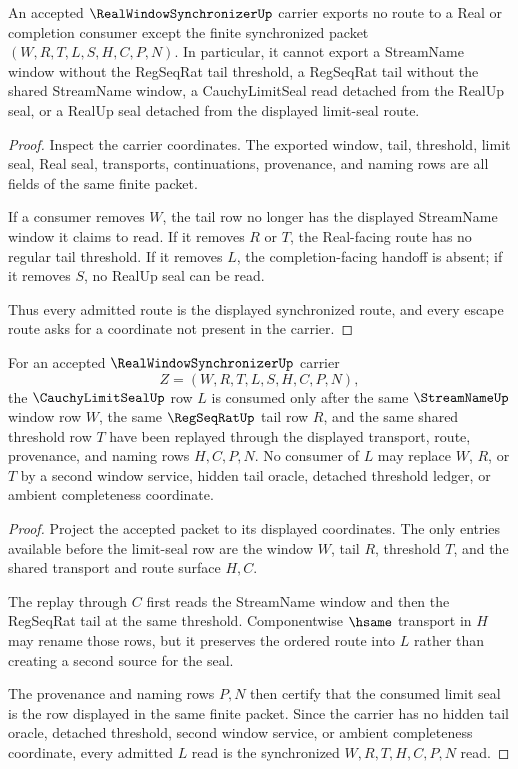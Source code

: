 \begin{theorem}
\label{thm:real-window-synchronizer-nonescape}
An accepted $\RealWindowSynchronizerUp$ carrier exports no route to a Real or completion consumer except the finite synchronized packet $(W,R,T,L,S,H,C,P,N)$. In particular, it cannot export a StreamName window without the RegSeqRat tail threshold, a RegSeqRat tail without the shared StreamName window, a CauchyLimitSeal read detached from the RealUp seal, or a RealUp seal detached from the displayed limit-seal route.
\end{theorem}
\begin{proof}
Inspect the carrier coordinates. The exported window, tail, threshold, limit seal, Real seal, transports, continuations, provenance, and naming rows are all fields of the same finite packet.

If a consumer removes $W$, the tail row no longer has the displayed StreamName window it claims to read. If it removes $R$ or $T$, the Real-facing route has no regular tail threshold. If it removes $L$, the completion-facing handoff is absent; if it removes $S$, no RealUp seal can be read.

Thus every admitted route is the displayed synchronized route, and every escape route asks for a coordinate not present in the carrier.
\end{proof}

\begin{theorem}
\label{thm:real-window-synchronizer-limit-seal-compatibility}
For an accepted $\RealWindowSynchronizerUp$ carrier
$$
Z=(W,R,T,L,S,H,C,P,N),
$$
the $\CauchyLimitSealUp$ row $L$ is consumed only after the same $\StreamNameUp$ window row $W$, the same $\RegSeqRatUp$ tail row $R$, and the same shared threshold row $T$ have been replayed through the displayed transport, route, provenance, and naming rows $H,C,P,N$. No consumer of $L$ may replace $W$, $R$, or $T$ by a second window service, hidden tail oracle, detached threshold ledger, or ambient completeness coordinate.
\end{theorem}
\begin{proof}
Project the accepted packet to its displayed coordinates. The only entries available before the limit-seal row are the window $W$, tail $R$, threshold $T$, and the shared transport and route surface $H,C$.

The replay through $C$ first reads the StreamName window and then the RegSeqRat tail at the same threshold. Componentwise $\hsame$ transport in $H$ may rename those rows, but it preserves the ordered route into $L$ rather than creating a second source for the seal.

The provenance and naming rows $P,N$ then certify that the consumed limit seal is the row displayed in the same finite packet. Since the carrier has no hidden tail oracle, detached threshold, second window service, or ambient completeness coordinate, every admitted $L$ read is the synchronized $W,R,T,H,C,P,N$ read.
\end{proof}

